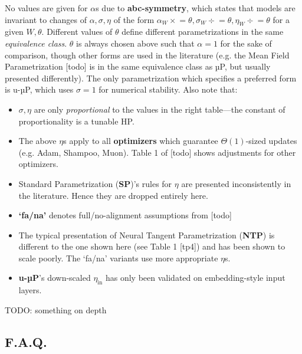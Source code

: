 \documentclass{article}
\newcommand{\timeseq}{\mathrel{\times}=}
\newcommand{\divideeq}{\mathrel{\div}=}
\begin{document}
\noindent
No values are given for $\alpha$s due to \textbf{abc-symmetry}, which states that models are invariant to changes of $\alpha, \sigma, \eta$ of the form $\alpha_W \timeseq \theta, \sigma_W \divideeq \theta, \eta_W \divideeq \theta$ for a given $W, \theta$. Different values of $\theta$ define different parametrizations in the same \textit{equivalence class}. $\theta$ is always chosen above such that $\alpha=1$ for the sake of comparison, though other forms are used in the literature (e.g. the Mean Field Parametrization [todo] is in the same equivalence class as µP, but usually presented differently). The only parametrization which specifies a preferred form is u-µP, which uses $\sigma=1$ for numerical stability. Also note that:

\noindent
\begin{multicols}{3} %
    \begin{itemize}[leftmargin=*]
        \item $\sigma, \eta$ are only \textit{proportional} to the values in the right table—the constant of proportionality is a tunable HP.
        \item The above $\eta$s apply to all \textbf{optimizers} which guarantee $\Theta(1)$-sized updates (e.g. Adam, Shampoo, Muon). Table 1 of [todo] shows adjustments for other optimizers.
        \item Standard Parametrization (\textbf{SP})'s rules for $\eta$ are presented inconsistently in the literature. Hence they are dropped entirely here.
        \item \textbf{`fa/na'} denotes full/no-alignment assumptions from [todo]
        \item The typical presentation of Neural Tangent Parametrization (\textbf{NTP}) is different to the one shown here (see Table 1 [tp4]) and has been shown to scale poorly. The `fa/na' variants use more appropriate $\eta$s.
        \item \textbf{u-µP}'s down-scaled $\eta_{\textrm{in}}$ has only been validated on embedding-style input layers.
    \end{itemize}
\end{multicols}

TODO: something on depth

\subsection*{F.A.Q.}
\vspace{-1em}
\end{document}
